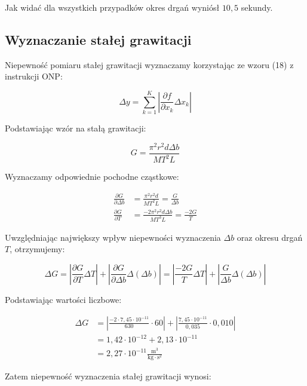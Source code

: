 \documentclass[a4paper,12pt]{article}
\begin{document}
Jak widać dla wszystkich przypadków okres drgań wyniósł $10,5$ sekundy.

\subsection{Wyznaczanie stałej grawitacji}

Niepewność pomiaru stałej grawitacji wyznaczamy korzystając ze wzoru (18) z instrukcji ONP:

\begin{equation}
\Delta y = \sum_{k=1}^{K} \left| \frac{\partial f}{\partial x_k} \Delta x_k \right|
\end{equation}

Podstawiając wzór na stałą grawitacji:

\begin{equation}
G = \frac{\pi^2 r^2 d \Delta b}{MT^2L}
\end{equation}

Wyznaczamy odpowiednie pochodne cząstkowe:

\begin{align}
\frac{\partial G}{\partial \Delta b} &= \frac{\pi^2 r^2 d}{MT^2L} = \frac{G}{\Delta b} \\[8pt]
\frac{\partial G}{\partial T} &= \frac{-2\pi^2 r^2 d \Delta b}{MT^3L} = \frac{-2G}{T}
\end{align}

Uwzględniając największy wpływ niepewności wyznaczenia $\Delta b$ oraz okresu drgań $T$, otrzymujemy:

\begin{equation}
\Delta G = \left| \frac{\partial G}{\partial T} \Delta T \right| + \left| \frac{\partial G}{\partial \Delta b} \Delta(\Delta b) \right| = \left| \frac{-2G}{T} \Delta T \right| + \left| \frac{G}{\Delta b} \Delta(\Delta b) \right|
\end{equation}

Podstawiając wartości liczbowe:

\begin{align}
\Delta G &= \left| \frac{-2 \cdot 7{,}45 \cdot 10^{-11}}{630} \cdot 60 \right| + \left| \frac{7{,}45 \cdot 10^{-11}}{0{,}035} \cdot 0{,}010 \right| \\[8pt]
&= 1{,}42 \cdot 10^{-12} + 2{,}13 \cdot 10^{-11} \\[8pt]
&= 2{,}27 \cdot 10^{-11} \frac{\text{m}^3}{\text{kg} \cdot \text{s}^2}
\end{align}

Zatem niepewność wyznaczenia stałej grawitacji wynosi:
\end{document}

